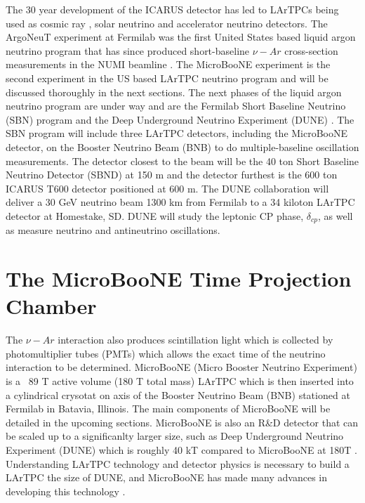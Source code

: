 The 30 year development of the ICARUS detector has led to LArTPCs being used as cosmic ray \cite{lartpc_cosmic}, solar neutrino \cite{lartpc_solar} and accelerator neutrino \cite{lartpc_accelerator} detectors. The ArgoNeuT experiment at Fermilab was the first United States based liquid argon neutrino program that has since produced short-baseline $\nu-Ar$ cross-section measurements in the NUMI beamline \cite{argoneut}. The MicroBooNE experiment is the second experiment in the US based LArTPC neutrino program and will be discussed thoroughly in the next sections.  
The next phases of the liquid argon neutrino program are under way and are the Fermilab Short Baseline Neutrino (SBN) program \cite{sbn} and the Deep Underground Neutrino Experiment (DUNE) \cite{dune}. The SBN program will include three LArTPC detectors, including the MicroBooNE detector, on the Booster Neutrino Beam (BNB) to do multiple-baseline oscillation measurements. The detector closest to the beam will be the 40 ton Short Baseline Neutrino Detector (SBND)\cite{sbnd} at 150 m and the detector furthest is the 600 ton ICARUS T600 \cite{icarus_t600} detector positioned at 600 m. The DUNE collaboration will deliver a 30 GeV neutrino beam 1300 km from Fermilab to a 34 kiloton LArTPC detector at Homestake, SD. DUNE will study the leptonic CP phase, $\delta_{cp}$, as well as measure neutrino and antineutrino oscillations. 
\section{The MicroBooNE Time Projection Chamber}The $\nu-Ar$ interaction also produces scintillation light which is collected by photomultiplier tubes (PMTs) which allows the exact time of the neutrino interaction to be determined.
MicroBooNE (Micro Booster Neutrino Experiment) is a ~89 T active volume (180 T total mass) LArTPC which is then inserted into a cylindrical crysotat on axis of the Booster Neutrino Beam (BNB) stationed at Fermilab in Batavia, Illinois. The main components of MicroBooNE will be detailed in the upcoming sections. MicroBooNE is also an R\&D detector that can be scaled up to a significanlty larger size, such as Deep Underground Neutrino Experiment (DUNE) which is roughly 40 kT compared to MicroBooNE at 180T \cite{dune}. Understanding LArTPC technology and detector physics is necessary to build a LArTPC the size of DUNE, and MicroBooNE has made many advances in developing this technology\cite{noisechar} \cite{michel}. 


